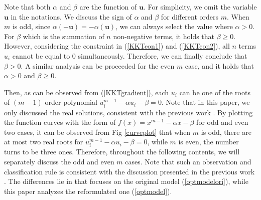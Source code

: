 \begin{remark}
	Note that both 
	$\alpha$ and $\beta$ 
	are the function of $\mathbf u$. 
	For simplicity, we omit the variable  $\mathbf u$ in the notations.
We  discuss the sign of $\alpha $ and  $\beta $  for  different orders $m$. 
When  $m$  is odd, 
since $\alpha(-\mathbf u) = -\alpha(\mathbf u) $,  we can always select  the value where $\alpha >0$. 
For $\beta$ which  is the summation of  $n$ non-negative  terms,  it  holds that  $\beta \ge 0$. 
However, considering the  constraint  in  (\ref{KKTcon1})  and
(\ref{KKTcon2}), all $n$ terms $u_{i}$ cannot be equal to 0 simultaneously.
Therefore, we can  finally  conclude that 
 $\beta > 0$. 
A similar  analysis can be proceeded   for the even $m$  case,  and it  holds that  $\alpha >0$  and  $\beta \ge 0$.
\end{remark}

Then,  as can be  observed  from (\ref{KKTgradient}),  each $u_{i}$   can  be  one of  the roots  of  $(m-1)$-order polynomial 
$ u_{i}^{m-1} -\alpha u_{i} - \beta =0  $.
Note that  in  this  paper,  we  only  discussed  the  real  solutions, consistent with the previous work \cite{teneigenstructure}.
By plotting  the  function  curves 
with  the  form  of 
 $  f(x) = x^{m-1} -\alpha x - \beta$
   for  odd  and  even  two  cases,  
it can be observed  from  Fig 	\ref{curveplot} that 
when $m$ is odd,  there are  at most  two  real  roots  for  $ u_{i}^{m-1} -\alpha u_{i} - \beta =0  $, 
while  $m$ is even,  the number  turns  to be three ones. 
Therefore, throughout  the  following  contents,  we  will  separately discuss  the odd and  even   $m$ cases.
Note that  such  an  observation  and  classification  rule is  consistent with the  discussion  presented in 
the previous work \cite{teneigenstructure}.
The  differences  lie  in  that 
\cite{teneigenstructure}  focuses   on the original model (\ref{optmodelori}), while  
this paper analyzes the  reformulated one (\ref{optmodel}).

